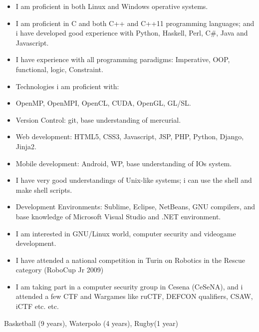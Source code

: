 \documentclass[helvetica,narrow,openbib,notitle,flagCMYK]{europecv}
\begin{document}
\begin{europecv}
	 {
		\begin{itemize}
			\item I am proficient in both Linux and Windows operative systems.
			\item I am proficient in C and both C++ and C++11 programming languages; and i have developed good experience with Python, Haskell, Perl, C\#, Java and Javascript.
			\item I have experience with all programming paradigms: Imperative, OOP, functional, logic, Constraint.
			\item Technologies i am proficient with:
			\item OpenMP, OpenMPI, OpenCL, CUDA, OpenGL, GL/SL.
			\item Version Control: git, base understanding of mercurial.
			\item Web development: HTML5, CSS3, Javascript, JSP, PHP, Python, Django, Jinja2.
			\item Mobile development: Android, WP, base understanding of IOs system.
			\item I have very good understandings of Unix-like systems; i can use the shell and make shell scripts.
			\item Development Environments: Sublime, Eclipse, NetBeans, GNU compilers, and base knowledge of Microsoft Visual Studio and .NET environment.
		\end{itemize}
	}
	 {
		\begin{itemize}
			\item I am interested in GNU/Linux world, computer security and videogame development. 
			\item I have attended a national competition in Turin on Robotics in the Rescue category (RoboCup Jr 2009) 
			\item I am taking part in a computer security group in Cesena (CeSeNA), and i attended a few CTF and Wargames like ruCTF, DEFCON qualifiers, CSAW, iCTF etc. etc.
		\end{itemize}
	}
	 {Basketball (9 years), Waterpolo (4 years), Rugby(1 year)}


	\end{europecv}
\end{document}

